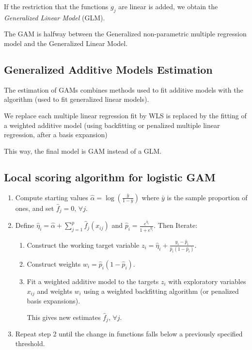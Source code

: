 If the restriction that the functions $g_j$ are linear is added,
we obtain the \emph{Generalized Linear Model} (GLM).

\begin{note}
The GAM is halfway between the Generalized non-parametric multiple regression model
and the Generalized Linear Model.
\end{note}

\subsection{Generalized Additive Models Estimation}

The estimation of GAMs combines methods used to fit additive models with the
 algorithm (used to fit generalized linear models).

We replace each multiple linear regression fit by WLS is replaced
by the fitting of a weighted additive model (using backfitting
or penalized multiple linear regression, after a basis expansion)

This way, the final model is GAM instead of a GLM.

\subsection{Local scoring algorithm for logistic GAM}

\begin{enumerate}
    \item Compute starting values $\hat \alpha = \log \left( \frac{\bar y}{1-\bar y} \right)$
        where $\bar y$ is the sample proportion of ones, and set $\hat f_j = 0,\,\forall j$.
    \item Define $\hat \eta_i = \hat \alpha + \sum_{j=1}^p \hat f_j(x_{ij})$ and
        $\hat p_i = \frac{e^{\hat \eta_i}}{1+e^{\hat \eta_i}}$.
    Then Iterate:
        \begin{enumerate}
            \item Construct the working target variable $z_i = \hat \eta_i + \frac{y_i - \hat p_i}{\hat p_i(1-\hat p_i)}$.
            \item Construct weights $w_i = \hat p_i(1-\hat p_i)$.
            \item Fit a weighted additive model to the targets $z_i$ with
                exploratory variables $x_{ij}$ and weights $w_i$ using
                a weighted backfitting algorithm (or penalized basis expansions).

                This gives new estimates $\hat f_j,\,\forall j$.
        \end{enumerate}
        \item Repeat step 2 until the change in functions falls below a previously
            specified threshold.
\end{enumerate}

